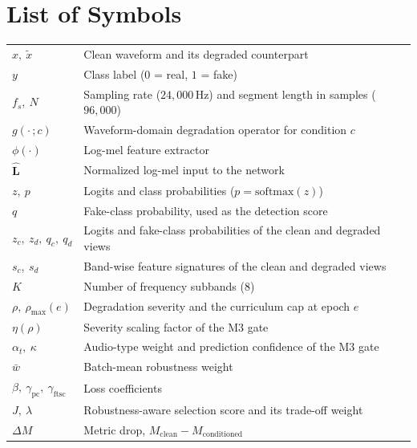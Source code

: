 \chapter*{List of Symbols}
\begingroup
\singlespacing\small
\renewcommand{\arraystretch}{1.25}
\noindent
\begin{tabular}{@{}p{}p{}@{}}
$x,\ \tilde{x}$ & Clean waveform and its degraded counterpart \\
$y$ & Class label ($0$ = real, $1$ = fake) \\
$f_s,\ N$ & Sampling rate ($24{,}000$\,Hz) and segment length in samples ($96{,}000$) \\
$g(\cdot\,;c)$ & Waveform-domain degradation operator for condition $c$ \\
$\phi(\cdot)$ & Log-mel feature extractor \\
$\hat{\mathbf{L}}$ & Normalized log-mel input to the network \\
$z,\ p$ & Logits and class probabilities ($p=\mathrm{softmax}(z)$) \\
$q$ & Fake-class probability, used as the detection score \\
$z_c,\ z_d,\ q_c,\ q_d$ & Logits and fake-class probabilities of the clean and degraded views \\
$s_c,\ s_d$ & Band-wise feature signatures of the clean and degraded views \\
$K$ & Number of frequency subbands ($8$) \\
$\rho,\ \rho_{\max}(e)$ & Degradation severity and the curriculum cap at epoch $e$ \\
$\eta(\rho)$ & Severity scaling factor of the M3 gate \\
$\alpha_t,\ \kappa$ & Audio-type weight and prediction confidence of the M3 gate \\
$\bar{w}$ & Batch-mean robustness weight \\
$\beta,\ \gamma_{\mathrm{pc}},\ \gamma_{\mathrm{ftsc}}$ & Loss coefficients \\
$J,\ \lambda$ & Robustness-aware selection score and its trade-off weight \\
$\Delta M$ & Metric drop, $M_{\mathrm{clean}}-M_{\mathrm{conditioned}}$ \\
\end{tabular}
\endgroup
